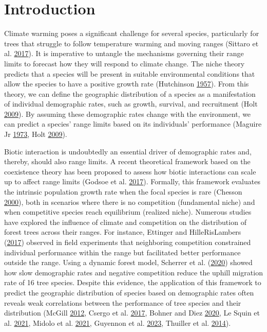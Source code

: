 \documentclass[12pt]{article}
\begin{document}
\hypertarget{introduction}{%
\section{Introduction}\label{introduction}}

Climate warming poses a significant challenge for several species,
particularly for trees that struggle to follow temperature warming and
moving ranges (Sittaro et al.
\protect\hyperlink{ref-Sittaro2017}{2017}). It is imperative to untangle
the mechanisms governing their range limits to forecast how they will
respond to climate change. The niche theory predicts that a species will
be present in suitable environmental conditions that allow the species
to have a positive growth rate (Hutchinson
\protect\hyperlink{ref-Hutchinson1957}{1957}). From this theory, we can
define the geographic distribution of a species as a manifestation of
individual demographic rates, such as growth, survival, and recruitment
(Holt \protect\hyperlink{ref-holt2009}{2009}). By assuming these
demographic rates change with the environment, we can predict a species'
range limits based on its individuals' performance (Maguire Jr
\protect\hyperlink{ref-maguire1973niche}{1973}, Holt
\protect\hyperlink{ref-holt2009}{2009}).

Biotic interaction is undoubtedly an essential driver of demographic
rates and, thereby, should also range limits. A recent theoretical
framework based on the coexistence theory has been proposed to assess
how biotic interactions can scale up to affect range limits (Godsoe et
al. \protect\hyperlink{ref-Godsoe2017}{2017}). Formally, this framework
evaluates the intrinsic population growth rate when the focal species is
rare (Chesson \protect\hyperlink{ref-Chesson2000a}{2000}), both in
scenarios where there is no competition (fundamental niche) and when
competitive species reach equilibrium (realized niche). Numerous studies
have explored the influence of climate and competition on the
distribution of forest trees across their ranges. For instance, Ettinger
and HilleRisLambers (\protect\hyperlink{ref-Ettinger2017}{2017})
observed in field experiments that neighboring competition constrained
individual performance within the range but facilitated better
performance outside the range. Using a dynamic forest model, Scherrer et
al. (\protect\hyperlink{ref-Scherrer2020}{2020}) showed how slow
demographic rates and negative competition reduce the uphill migration
rate of 16 tree species. Despite this evidence, the application of this
framework to predict the geographic distribution of species based on
demographic rates often reveals weak correlations between the
performance of tree species and their distribution (McGill
\protect\hyperlink{ref-McGill2012}{2012}, Csergo et al.
\protect\hyperlink{ref-Csergo2017}{2017}, Bohner and Diez
\protect\hyperlink{ref-bohner2020}{2020}, Le Squin et al.
\protect\hyperlink{ref-LeSquin2021}{2021}, Midolo et al.
\protect\hyperlink{ref-Midolo2021}{2021}, Guyennon et al.
\protect\hyperlink{ref-Guyennon2023}{2023}, Thuiller et al.
\protect\hyperlink{ref-Thuiller2014}{2014}).
\end{document}
